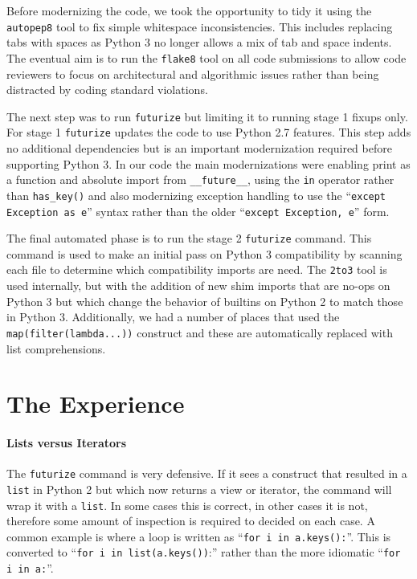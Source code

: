 \documentclass[11pt,twoside]{article}
\begin{document}
Before modernizing the code, we took the opportunity to tidy it using the \texttt{autopep8} tool to fix simple whitespace inconsistencies.
This includes replacing tabs with spaces as Python 3 no longer allows a mix of tab and space indents.
The eventual aim is to run the \texttt{flake8} tool on all code submissions to allow code reviewers to focus on architectural and algorithmic issues rather than being distracted by coding standard violations.

The next step was to run \texttt{futurize} but limiting it to running stage 1 fixups only.
For stage 1 \texttt{futurize} updates the code to use Python 2.7 features.
This step adds no additional dependencies but is an important modernization required before supporting Python 3.
In our code the main modernizations were enabling print as a function and absolute import from \texttt{\_\_future\_\_}, using the \texttt{in} operator rather than \texttt{has\_key()} and also modernizing exception handling to use the ``\texttt{except Exception as e}'' syntax rather than the older ``\texttt{except Exception, e}'' form.

The final automated phase is to run the stage 2 \texttt{futurize} command.
This command is used to make an initial pass on Python 3 compatibility by scanning each file to determine which compatibility imports are need.
The \texttt{2to3} tool is used internally, but with the addition of new shim imports that are no-ops on Python 3 but which change the behavior of builtins on Python 2 to match those in Python 3.
Additionally, we had a number of places that used the \texttt{map(filter(lambda...))} construct and these are automatically replaced with list comprehensions.

\section{The Experience}

\paragraph{Lists versus Iterators}

The \texttt{futurize} command is very defensive.
If it sees a construct that resulted in a \texttt{list} in Python 2 but which now returns a view or iterator, the command will wrap it with a \texttt{list}.
In some cases this is correct, in other cases it is not, therefore some amount of inspection is required to decided on each case.
A common example is where a loop is written as ``\texttt{for i in a.keys():}''.
This is converted to ``\texttt{for i in list(a.keys())}:'' rather than the more idiomatic ``\texttt{for i in a:}''.
\end{document}
